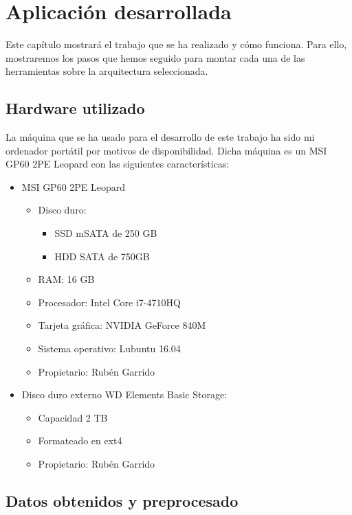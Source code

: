 \chapter{Aplicación desarrollada\label{desarrollo}}

Este capítulo mostrará el trabajo que se ha realizado y cómo funciona.
Para ello, mostraremos los pasos que hemos seguido para montar cada
una de las herramientas sobre la arquitectura seleccionada.

\section {Hardware utilizado\label{hardware}}

La máquina que se ha usado para el desarrollo de este trabajo ha sido
mi ordenador portátil por motivos de disponibilidad. Dicha máquina es
un MSI GP60 2PE Leopard con las siguientes características:

\begin{itemize}
\item MSI GP60 2PE Leopard
  \begin{itemize}
  \item Disco duro:
    \begin{itemize}
    \item SSD mSATA de 250 GB
    \item HDD SATA de 750GB
    \end{itemize}
  \item RAM: 16 GB
  \item Procesador: Intel Core i7-4710HQ
  \item Tarjeta gráfica: NVIDIA GeForce 840M
  \item Sistema operativo: Lubuntu 16.04
  \item Propietario: Rubén Garrido
  \end{itemize}
\item Disco duro externo WD Elements Basic Storage:
  \begin{itemize}
  \item Capacidad 2 TB
  \item Formateado en ext4
  \item Propietario: Rubén Garrido
  \end{itemize}
\end{itemize}

\section {Datos obtenidos y preprocesado\label{datos}}

